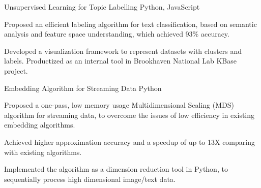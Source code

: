 


\begin{cventries}

\projentry
{Unsupervised Learning for Topic Labelling} %
{Python, JavaScript} %
{ 
\begin{cvitems}
\item{Proposed an efficient labeling algorithm for text classification, based on semantic analysis and feature space understanding, which achieved 93\% accuracy. }
\item{Developed a visualization framework to represent datasets with clusters and labels. Productized as an internal tool in Brookhaven National Lab KBase project.}
\end{cvitems}
}


\projentry
{Embedding Algorithm for Streaming Data} %
{Python} %
{ 
\begin{cvitems}
\item{Proposed a one-pass, low memory usage Multidimensional Scaling ({MDS}) algorithm for streaming data, to overcome the issues of low efficiency in existing embedding algorithms.}
\item{Achieved higher approximation accuracy and a speedup of up to 13X comparing with existing algorithms.}
\item{Implemented the algorithm as a dimension reduction tool in Python, to sequentially process high dimensional image/text data. }
\end{cvitems}
}



\end{cventries}
